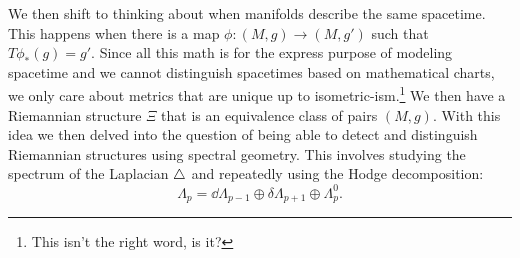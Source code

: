 \documentclass{homework}
\begin{document}
We then shift to thinking about when manifolds describe the same spacetime.
This happens when there is a map $\phi: (M, g)\to(M, g')$ such that $T\phi_*(g) = g'$.
Since all this math is for the express purpose of modeling spacetime and we cannot distinguish spacetimes based on mathematical charts, we only care about metrics that are unique up to isometric-ism.\footnote{This isn't the right word, is it?}
We then have a Riemannian structure $\Xi$ that is an equivalence class of pairs $(M,g)$.
With this idea we then delved into the question of being able to detect and distinguish Riemannian structures using spectral geometry.
This involves studying the spectrum of the Laplacian $\triangle$ and repeatedly using the Hodge decomposition:
\begin{equation*}
	\Lambda_p = \dd\Lambda_{p-1}\oplus\delta\Lambda_{p+1}\oplus\Lambda^0_p.
\end{equation*}
\end{document}
